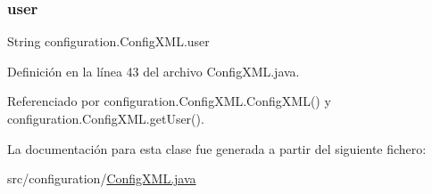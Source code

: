 \subsubsection{\texorpdfstring{user}{user}}
{\footnotesize\ttfamily String configuration.\+Config\+X\+M\+L.\+user\hspace{0.3cm}{\ttfamily [private]}}



Definición en la línea 43 del archivo Config\+X\+M\+L.\+java.



Referenciado por configuration.\+Config\+X\+M\+L.\+Config\+X\+M\+L() y configuration.\+Config\+X\+M\+L.\+get\+User().



La documentación para esta clase fue generada a partir del siguiente fichero\+:\begin{DoxyCompactItemize}
\item 
src/configuration/\mbox{\hyperlink{ConfigXML_8java}{Config\+X\+M\+L.\+java}}\end{DoxyCompactItemize}
